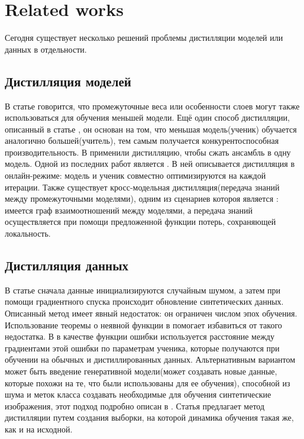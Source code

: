 \documentclass[12pt]{article}
\begin{document}
\section{Related works}

 Сегодня существует несколько решений проблемы дистилляции моделей или данных в отдельности. 

\subsection{Дистилляция моделей}
В статье \cite{romero2014fitnets} говорится, что промежуточные веса или особенности слоев могут также использоваться для обучения меньшей модели. Ещё один способ дистилляции, описанный в статье \cite{ba2014deep}, он основан на том, что меньшая модель(ученик) обучается аналогично большей(учитель), тем самым получается конкурентоспособная производительность. В \cite{hinton2015distilling} применили дистилляцию, чтобы сжать ансамбль в одну модель. Одной из последних работ является \cite{chung2020feature}. В ней описывается дистилляция в онлайн-режиме: модель и ученик совместно оптимизируются на каждой итерации. Также существует кросс-модельная дистилляция(передача знаний между промежуточными моделями), одним из сценариев котороя является \cite{chen2021learning}: имеется граф взаимоотношений между моделями, а передача знаний осуществляется при помощи предложенной функции потерь, сохраняющей локальность.


\subsection{Дистилляция данных}
В статье \cite{wang2018dataset} сначала данные инициализируются случайным шумом, а затем при помощи градиентного спуска происходит обновление синтетических данных. Описанный метод имеет явный недостаток: он ограничен числом эпох обучения. Использование теоремы о неявной функции в \cite{lorraine2020optimizing} помогает избавиться от такого недостатка. В \cite{zhao2020dataset} в качестве функции ошибки используется расстояние между градиентами этой ошибки по параметрам ученика, которые получаются при обучении на обычных и дистиллированных данных. Альтернативным вариантом может быть введение генеративной модели(может создавать новые данные, которые похожи на те, что были использованы для ее обучения), способной из шума и меток класса создавать необходимые для обучения синтетические изображения, этот подход подробно описан в \cite{such2020generative}.
Статья \cite{cazenavette2022dataset} предлагает метод дистилляции путем создания выборки, на которой динамика обучения такая же, как и на исходной.
\end{document}
